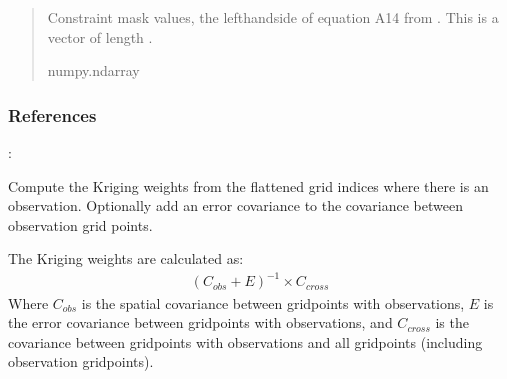 \documentclass[letterpaper,10pt,english]{sphinxmanual}
\begin{document}
\begin{fulllineitems}
\begin{fulllineitems}
\begin{quote}
\begin{description}
\sphinxAtStartPar
{} \textendash{} Constraint mask values, the left\sphinxhyphen{}hand\sphinxhyphen{}side of equation A14 from
. This is a vector of length .

\sphinxAtStartPar
numpy.ndarray

\end{description}\end{quote}
\subsubsection*{References}

\sphinxAtStartPar
{}: 

\end{fulllineitems}


\begin{fulllineitems}
\label{\detokenize{kriging:glomar_gridding.stochastic.StochasticKriging.get_kriging_weights}}
\pysigstartsignatures
\pysiglinewithargsret
{}
{\sphinxparamcomma {}}
{}
\pysigstopsignatures
\sphinxAtStartPar
Compute the Kriging weights from the flattened grid indices where
there is an observation. Optionally add an error covariance to the
covariance between observation grid points.

\sphinxAtStartPar
The Kriging weights are calculated as:
\begin{equation*}
\begin{split}(C_{obs} + E)^{-1} \times C_{cross}\end{split}
\end{equation*}
\sphinxAtStartPar
Where \(C_{obs}\) is the spatial covariance between grid\sphinxhyphen{}points
with observations, \(E\) is the error covariance between grid\sphinxhyphen{}points
with observations, and \(C_{cross}\) is the covariance between
grid\sphinxhyphen{}points with observations and all grid\sphinxhyphen{}points (including observation
grid\sphinxhyphen{}points).


\end{fulllineitems}
\end{fulllineitems}
\end{document}

